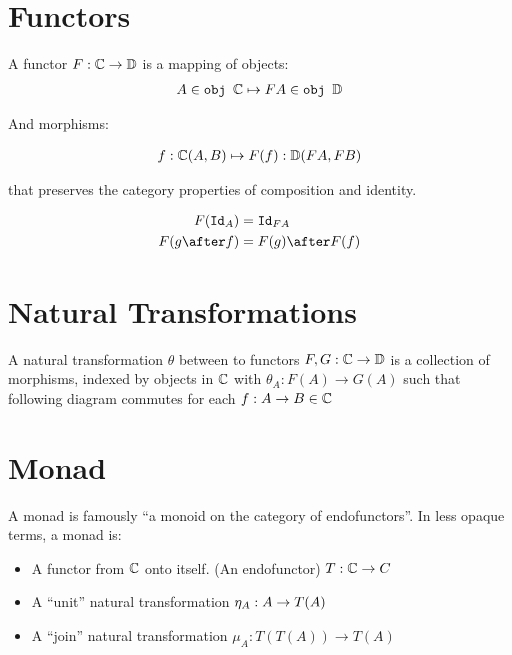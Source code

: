 \documentclass{Report}
\begin{document}
\section{Functors}
A functor $F: \mathbb{C} \rightarrow \mathbb{D}$ is a mapping of objects:
\begin{align}
    A\in\texttt{obj }\mathbb{C} \mapsto FA \in \texttt{obj }\mathbb{D}
\end{align}

And morphisms:

\begin{align}
    f: \mathbb{C}(A, B) \mapsto F(f): \mathbb{D}(FA, FB)
\end{align}

that preserves the category properties of composition and identity.

\begin{align}
    F(\Id{A}) & = \Id{FA} \\
    F(g\after f) & = F(g)\after F(f)
\end{align}

\section{Natural Transformations}

A natural transformation $\theta$ between to functors $F, G: \mathbb{C} \rightarrow \mathbb{D}$ is a collection of morphisms, indexed by objects in $\mathbb{C}$ with  $\theta_A: F(A) \rightarrow G(A)$ such that following diagram commutes for each $f: A \rightarrow B \in \mathbb{C}$


\section{Monad}

A monad is famously ``a monoid on the category of endofunctors''. In less opaque terms, a monad is:

\begin{itemize}
    \item A functor from $\mathbb{C}$ onto itself. (An endofunctor) $T: \mathbb{C} \rightarrow C$
    \item A ``unit'' natural transformation $\eta_{A}: A\rightarrow T(A)$
    \item A ``join'' natural transformation $\mu_{A}: T(T(A)) \rightarrow T(A)$
\end{itemize}
\end{document}

